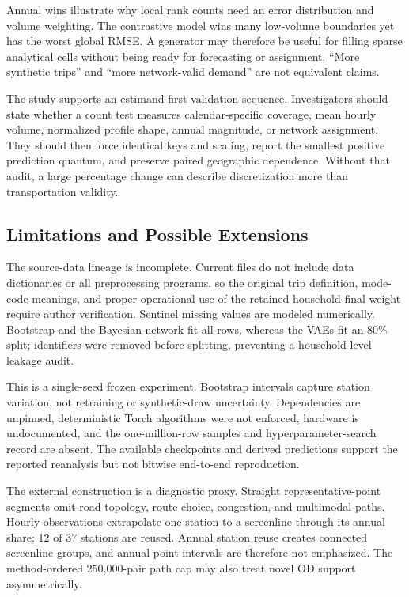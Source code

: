 \documentclass[numbered]{trbunofficial}
\begin{document}
Annual wins illustrate why local rank counts need an error distribution and volume weighting. The contrastive model wins many low-volume boundaries yet has the worst global RMSE. A generator may therefore be useful for filling sparse analytical cells without being ready for forecasting or assignment. ``More synthetic trips'' and ``more network-valid demand'' are not equivalent claims.

The study supports an estimand-first validation sequence. Investigators should state whether a count test measures calendar-specific coverage, mean hourly volume, normalized profile shape, annual magnitude, or network assignment. They should then force identical keys and scaling, report the smallest positive prediction quantum, and preserve paired geographic dependence. Without that audit, a large percentage change can describe discretization more than transportation validity.

\subsection{Limitations and Possible Extensions}

The source-data lineage is incomplete. Current files do not include data dictionaries or all preprocessing programs, so the original trip definition, mode-code meanings, and proper operational use of the retained household-final weight require author verification. Sentinel missing values are modeled numerically. Bootstrap and the Bayesian network fit all rows, whereas the VAEs fit an 80\% split; identifiers were removed before splitting, preventing a household-level leakage audit.

This is a single-seed frozen experiment. Bootstrap intervals capture station variation, not retraining or synthetic-draw uncertainty. Dependencies are unpinned, deterministic Torch algorithms were not enforced, hardware is undocumented, and the one-million-row samples and hyperparameter-search record are absent. The available checkpoints and derived predictions support the reported reanalysis but not bitwise end-to-end reproduction.

The external construction is a diagnostic proxy. Straight representative-point segments omit road topology, route choice, congestion, and multimodal paths. Hourly observations extrapolate one station to a screenline through its annual share; 12 of 37 stations are reused. Annual station reuse creates connected screenline groups, and annual point intervals are therefore not emphasized. The method-ordered 250,000-pair path cap may also treat novel OD support asymmetrically.
\end{document}
